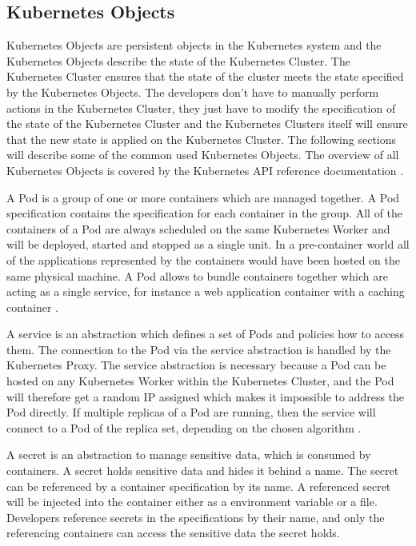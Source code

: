 \subsection{Kubernetes Objects}
\label{sec:caas-kubernetes-objects}
Kubernetes Objects are persistent objects in the Kubernetes system and the Kubernetes Objects describe the state of the Kubernetes Cluster. The Kubernetes Cluster ensures that the state of the cluster meets the state specified by the Kubernetes Objects. The developers don't have to manually perform actions in the Kubernetes Cluster, they just have to modify the specification of the state of the Kubernetes Cluster and the Kubernetes Clusters itself will ensure that the new state is applied on the Kubernetes Cluster. The following sections will describe some of the common used Kubernetes Objects. The overview of all Kubernetes Objects is covered by the Kubernetes API reference documentation \cite{CNCFKubernetesAPI2018}. 

A Pod is a group of one or more containers which are managed together. A Pod specification contains the specification for each container in the group. All of the containers of a Pod are always scheduled on the same Kubernetes Worker and will be deployed, started and stopped as a single unit. In a pre-container world all of the applications represented by the containers would have been hosted on the same physical machine. A Pod allows to bundle containers together which are acting as a single service, for instance a web application container with a caching container \cite{CNCFKubernetesPods2018}. 

A service is an abstraction which defines a set of Pods and policies how to access them. The connection to the Pod via the service abstraction is handled by the Kubernetes Proxy. The service abstraction is necessary because a Pod can be hosted on any Kubernetes Worker within the Kubernetes Cluster,  and the Pod will therefore get a random IP assigned which makes it impossible to address the Pod directly. If multiple replicas of a Pod are running, then the service will connect to a Pod of the replica set, depending on the chosen algorithm \cite{CNCFKubernetesServices2018}.

A secret is an abstraction to manage sensitive data, which is consumed by containers. A secret holds sensitive data and hides it behind a name. The secret can be referenced by a container specification by its name. A referenced secret will be injected into the container either as a environment variable or a file. Developers reference secrets in the specifications by their name, and only the referencing containers can access the sensitive data the secret holds. 

